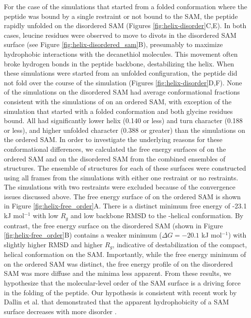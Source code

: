 For the case of the simulations that started from a folded conformation where the peptide was bound by a single restraint or not bound to the SAM, the peptide rapidly unfolded on the disordered SAM (Figures \ref{fig:helix-disorder}C,E). 
In both cases, leucine residues were observed to move to divots in the disordered SAM surface (see Figure \ref{fig:helix-disordered_sam}B), presumably to maximize hydrophobic interactions with the decanethiol molecules. 
This movement often broke hydrogen bonds in the peptide backbone, destabilizing the helix. 
When these simulations were started from an unfolded configuration, the peptide did not fold over the course of the simulation (Figures \ref{fig:helix-disorder}D,F). 
None of the simulations on the disordered SAM had average conformational fractions consistent with the simulations of \pep{} on an ordered SAM, with exception of the simulation that started with a folded conformation and both glycine residues bound. 
All had significantly lower helix (0.140 or less) and turn character (0.188 or less), and higher unfolded character (0.388 or greater) than the simulations on the ordered SAM. 
In order to investigate the underlying reasons for these conformational differences, we calculated the free energy surfaces of \pep{} on the ordered SAM and \pep{} on the disordered SAM from the combined ensembles of structures. 
The ensemble of structures for each of these surfaces were constructed using all frames from the simulations with either one restraint or no restraints. 
The simulations with two restraints were excluded because of the convergence issues discussed above. 
The free energy surface of \pep{} on the ordered SAM is shown in Figure \ref{fig:helix-free_order}A. 
There is a distinct minimum free energy of -23.1 kJ mol$^{-1}$ with low $R_g$ and low backbone RMSD to the \textalpha{}-helical conformation. 
By contrast, the free energy surface on the disordered SAM (shown in Figure \ref{fig:helix-free_order}B) contains a weaker minimum ($\Delta G = -20.1$ kJ mol$^{-1}$) with slightly higher RMSD and higher $R_g$, indicative of destabilization of the compact, helical conformation on the SAM. 
Importantly, while the free energy minimum of \pep{} on the ordered SAM was distinct, the free energy profile of \pep{} on the disordered SAM was more diffuse and the minima less apparent. 
From these results, we hypothesize that the molecular-level order of the SAM surface is a driving force in the folding of the peptide. 
Our hypothesis is consistent with recent work by Dallin et al. that demonstrated that the apparent hydrophobicity of a SAM surface decreases with more disorder \cite{Dallin2019}.   
